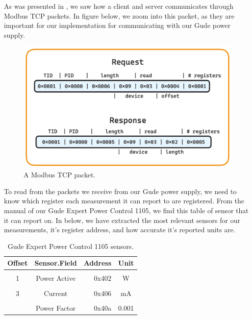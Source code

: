 \documentclass[
  table]{report}
\begin{document}
As was presented in , we saw how a client and
server communicates through Modbus TCP packets. In figure
 below, we zoom into this packet, as they
are important for our implementation for communicating with our Gude
power supply.

\begin{figure}[H]
\centering
  \includegraphics[width=0.7\columnwidth]{assets/6-modbus_packet.png}
  \caption{A Modbus TCP packet.}
  \label{fig:modbus_tcp_packet}
\end{figure}

To read from the packets we receive from our Gude power supply, we need
to know which register each measurement it can report to are registered.
From the manual of our Gude Expert Power Control 1105, we find this
table of sensor that it can report on. In  below,
we have extracted the most relevant sensors for our measurements, it's
register address, and how accurate it's reported units are.

\begin{table}[H]
\centering
\caption{\label{tab:unnamed-chunk-1}Gude Expert Power Control 1105 sensors. \label{tab:gude_config}}
\centering
\begin{tabular}[t]{ccrc}
\toprule
Offset & Sensor.Field & Address & Unit\\
\midrule
\cellcolor{gray!10}{0} & \cellcolor{gray!10}{Absolute Active Energy} & \cellcolor{gray!10}{0x400} & \cellcolor{gray!10}{Wh}\\
1 & Power Active & 0x402 & W\\
\cellcolor{gray!10}{2} & \cellcolor{gray!10}{Voltage} & \cellcolor{gray!10}{0x404} & \cellcolor{gray!10}{V}\\
3 & Current & 0x406 & mA\\
\cellcolor{gray!10}{4} & \cellcolor{gray!10}{Frequency} & \cellcolor{gray!10}{0x408} & \cellcolor{gray!10}{0.01hz}\\
\addlinespace
5 & Power Factor & 0x40a & 0.001\\
\bottomrule
\end{tabular}
\end{table}
\end{document}
